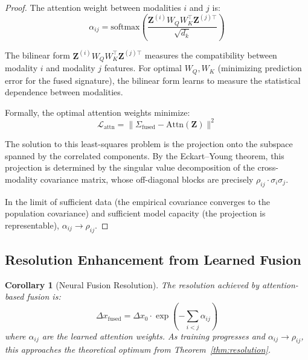 \documentclass[11pt,twocolumn,a4paper]{article}
\newtheorem{corollary}[theorem]{Corollary}
\theoremstyle{definition}
\theoremstyle{remark}
\newcommand{\Sig}{\Sigma}
\newcommand{\loss}{\mathcal{L}}
\begin{document}
\begin{proof}
The attention weight between modalities $i$ and $j$ is:
\begin{equation}
\alpha_{ij} = \text{softmax}\left(\frac{\mathbf{Z}^{(i)} W_Q W_K^\top \mathbf{Z}^{(j)\top}}{\sqrt{d_k}}\right)
\end{equation}

The bilinear form $\mathbf{Z}^{(i)} W_Q W_K^\top \mathbf{Z}^{(j)\top}$ measures the compatibility between modality $i$ and modality $j$ features. For optimal $W_Q, W_K$ (minimizing prediction error for the fused signature), the bilinear form learns to measure the statistical dependence between modalities.

Formally, the optimal attention weights minimize:
\begin{equation}
\loss_{\text{attn}} = \|\Sig_{\text{fused}} - \text{Attn}(\mathbf{Z})\|^2
\end{equation}

The solution to this least-squares problem is the projection onto the subspace spanned by the correlated components. By the Eckart--Young theorem, this projection is determined by the singular value decomposition of the cross-modality covariance matrix, whose off-diagonal blocks are precisely $\rho_{ij} \cdot \sigma_i \sigma_j$.

In the limit of sufficient data (the empirical covariance converges to the population covariance) and sufficient model capacity (the projection is representable), $\alpha_{ij} \to \rho_{ij}$.
\end{proof}

\subsection{Resolution Enhancement from Learned Fusion}

\begin{corollary}[Neural Fusion Resolution]
The resolution achieved by attention-based fusion is:
\begin{equation}
\Delta x_{\text{fused}} = \Delta x_0 \cdot \exp\left(-\sum_{i<j} \alpha_{ij}\right)
\end{equation}
where $\alpha_{ij}$ are the learned attention weights. As training progresses and $\alpha_{ij} \to \rho_{ij}$, this approaches the theoretical optimum from Theorem~\ref{thm:resolution}.
\end{corollary}
\end{document}
